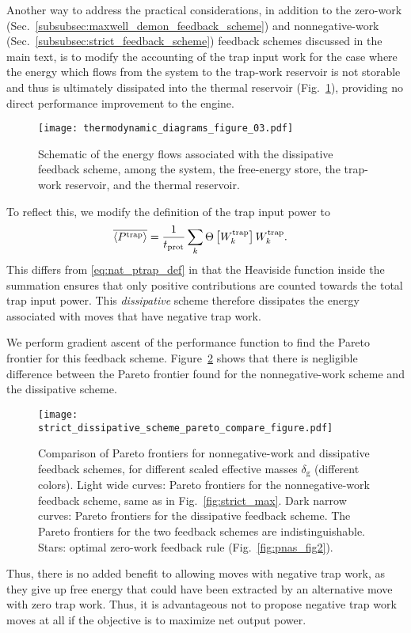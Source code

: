 \documentclass[%
reprint,
bibnotes, amsmath, amssymb, aps, pre,
 showkeys,
floatfix
]{revtex4-2}
\newcommand{\mrm}{\mathrm}
\newcommand{\sr}[1]{\left[#1\right]} %
\newcommand{\dg}{\delta_{\mrm{g}}}
\newcommand{\wt}{W^{\mrm{trap}}}
\newcommand{\eptm}{\overline{\ev{P^{\mrm{trap}}}}}
\begin{document}
Another way to address the practical considerations, in addition to the zero-work (Sec.~\ref{subsubsec:maxwell_demon_feedback_scheme}) and nonnegative-work (Sec.~\ref{subsubsec:strict_feedback_scheme}) feedback schemes discussed in the main text, is to modify the accounting of the trap input work for the case where the energy which flows from the system to the trap-work reservoir is not storable and thus is ultimately dissipated into the thermal reservoir (Fig.~\ref{fig:diss_thermo_diagram}), providing no direct performance improvement to the engine. 
\begin{figure}
    \centering 
    \texttt{[image: thermodynamic\_diagrams\_figure\_03.pdf]}
    \caption{
        Schematic of the energy flows
        associated with the dissipative feedback scheme,
        among the system, the free-energy store, the trap-work reservoir, and the thermal reservoir.
        }
    \label{fig:diss_thermo_diagram}
\end{figure}
To reflect this, we modify the definition of the trap input power to 
\begin{align}
    \eptm &= \frac{1}{t_{\mrm{prot}}}\sum_{k}\Theta\sr{\wt_{k}}\wt_{k}.\label{eq:ptrap_blind}
\end{align}
This differs from \eqref{eq:nat_ptrap_def} in that the Heaviside function inside the summation ensures that only positive contributions are counted towards the total trap input power.
This \emph{dissipative} scheme therefore dissipates the energy associated with moves that have negative trap work.

We perform gradient ascent of the performance function to find the Pareto frontier for this feedback scheme.  
Figure~\ref{fig:dissipative_max} shows that there is negligible difference between the Pareto frontier found for the nonnegative-work scheme and the dissipative scheme.
\begin{figure}[!htbp]
    \centering
    \texttt{[image: strict\_dissipative\_scheme\_pareto\_compare\_figure.pdf]}
    \caption{ 
        Comparison of Pareto frontiers for nonnegative-work and dissipative feedback schemes, for different scaled effective masses $\dg$ (different colors). 
        Light wide curves: Pareto frontiers for the nonnegative-work feedback scheme, same as in Fig.~\ref{fig:strict_max}.
        Dark narrow curves: Pareto frontiers for the dissipative feedback scheme.
        The Pareto frontiers for the two feedback schemes are indistinguishable.
        Stars: optimal zero-work feedback rule (Fig.~\ref{fig:pnas_fig2}). 
        }
    \label{fig:dissipative_max}
\end{figure}
Thus, there is no added benefit to allowing moves with negative trap work, as they give up free energy that could have been extracted by an alternative move with zero trap work.
Thus, it is advantageous not to propose negative trap work moves at all if the objective is to maximize net output power.
\end{document}
